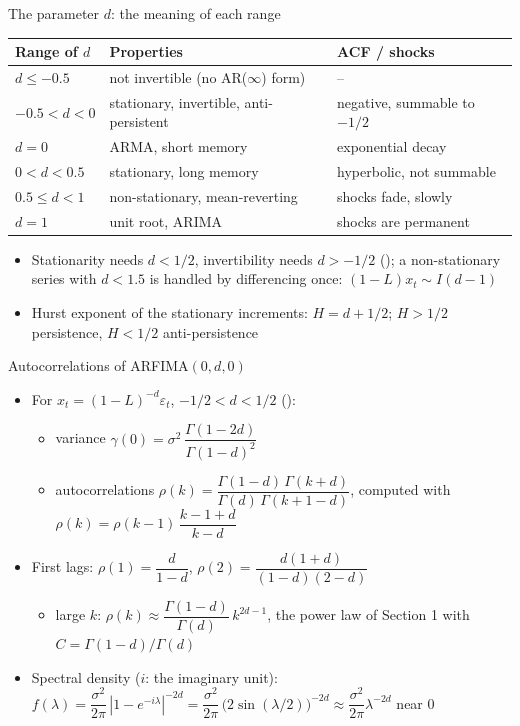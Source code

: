 \begin{frame}{The parameter $d$: the meaning of each range}
\itemsize{\small}
\begin{center}
\footnotesize
\begin{tabular}{lll}
\toprule
\textbf{Range of $d$} & \textbf{Properties} & \textbf{ACF / shocks} \\
\midrule
$d \le -0.5$ & not invertible (no AR($\infty$) form) & -- \\
$-0.5 < d < 0$ & stationary, invertible, anti-persistent & negative, summable to $-1/2$ \\
$d = 0$ & ARMA, short memory & exponential decay \\
$0 < d < 0.5$ & stationary, long memory & hyperbolic, not summable \\
$0.5 \le d < 1$ & non-stationary, mean-reverting & shocks fade, slowly \\
$d = 1$ & unit root, ARIMA & shocks are permanent \\
\bottomrule
\end{tabular}
\end{center}
\begin{itemize}
    \item Stationarity needs $d < 1/2$, invertibility needs $d > -1/2$ (); a non-stationary series with $d < 1.5$ is handled by differencing once: $(1-L)x_t \sim I(d-1)$
    \item Hurst exponent of the stationary increments: $H = d + 1/2$; $H > 1/2$ persistence, $H < 1/2$ anti-persistence
\end{itemize}
\end{frame}

\begin{frame}{Autocorrelations of ARFIMA$(0,d,0)$}
\itemsize{\small}
\begin{itemize}
    \item For $x_t = (1-L)^{-d}\varepsilon_t$, $-1/2 < d < 1/2$ ():
    \begin{itemize}
        \item variance $\gamma(0) = \sigma^2\,\dfrac{\Gamma(1-2d)}{\Gamma(1-d)^2}$
        \item autocorrelations $\rho(k) = \dfrac{\Gamma(1-d)\,\Gamma(k+d)}{\Gamma(d)\,\Gamma(k+1-d)}$, computed with $\rho(k) = \rho(k-1)\,\dfrac{k-1+d}{k-d}$
    \end{itemize}
    \item First lags: $\rho(1) = \dfrac{d}{1-d}$, \quad $\rho(2) = \dfrac{d(1+d)}{(1-d)(2-d)}$
    \begin{itemize}
        \item large $k$: $\rho(k) \approx \dfrac{\Gamma(1-d)}{\Gamma(d)}\,k^{2d-1}$, the power law of Section 1 with $C = \Gamma(1-d)/\Gamma(d)$
    \end{itemize}
    \item Spectral density ($i$: the imaginary unit): $f(\lambda) = \dfrac{\sigma^2}{2\pi}\,|1 - e^{-i\lambda}|^{-2d} = \dfrac{\sigma^2}{2\pi}\,\bigl(2\sin(\lambda/2)\bigr)^{-2d} \approx \dfrac{\sigma^2}{2\pi}\lambda^{-2d}$ near 0
\end{itemize}
\end{frame}

